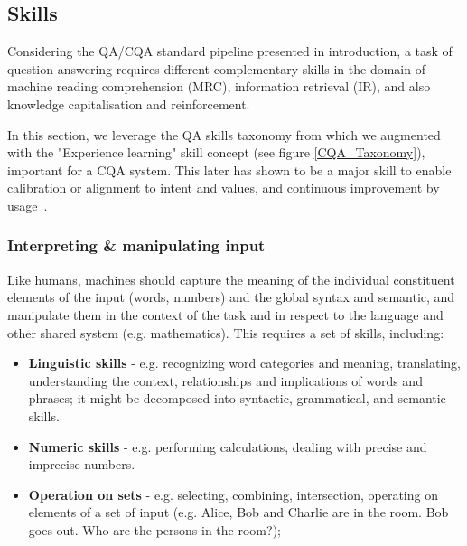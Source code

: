 \documentclass[acmsmall]{acmart}
\begin{document}

\subsection{Skills}\label{sec_skills}

Considering the QA/CQA standard pipeline presented in introduction, a task of question answering requires different complementary skills in the domain of machine reading comprehension (MRC), information retrieval (IR), and also knowledge capitalisation and reinforcement.

In this section, we leverage the QA skills taxonomy from \citet{rogersQADatasetExplosion2022} which we augmented with the "Experience learning" skill concept (see figure \ref{CQA_Taxonomy}), important for a CQA system. This later has shown to be a major skill to enable calibration or alignment to intent and values, and continuous improvement by usage~\citep{baiConstitutionalAIHarmlessness2022, chiuKnowledgeGroundedReinforcementLearning2022}.

\subsubsection{\textbf{Interpreting \& manipulating input}}
Like humans, machines should capture the meaning of the individual constituent elements of the input (words, numbers) and the global syntax and semantic, and manipulate them in the context of the task and in respect to the language and other shared system (e.g. mathematics). This  requires a set of skills, including: 
\begin{itemize}
    \item \textbf{Linguistic skills} - e.g. recognizing word categories and meaning, translating, understanding the context, relationships and implications of words and phrases; it might be decomposed into syntactic, grammatical, and semantic skills.
    \item \textbf{Numeric skills} - e.g. performing calculations, dealing with precise and imprecise numbers.
    \item \textbf{Operation on sets} - e.g. selecting, combining, intersection, operating on elements of a set of input (e.g. Alice, Bob and Charlie are in the room. Bob goes out. Who are the persons in the room?);
\end{itemize}
\end{document}
